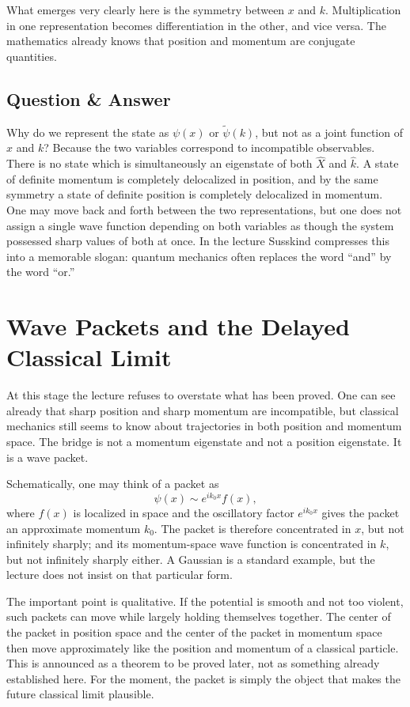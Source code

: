 What emerges very clearly here is the symmetry between \(x\) and \(k\). Multiplication in one representation becomes differentiation in the other, and vice versa. The mathematics already knows that position and momentum are conjugate quantities.

\subsection{Question \& Answer}

Why do we represent the state as \(\psi(x)\) or \(\tilde\psi(k)\), but not as a joint function of \(x\) and \(k\)? Because the two variables correspond to incompatible observables. There is no state which is simultaneously an eigenstate of both \(\hat X\) and \(\hat k\). A state of definite momentum is completely delocalized in position, and by the same symmetry a state of definite position is completely delocalized in momentum. One may move back and forth between the two representations, but one does not assign a single wave function depending on both variables as though the system possessed sharp values of both at once. In the lecture Susskind compresses this into a memorable slogan: quantum mechanics often replaces the word ``and'' by the word ``or.''

\section{Wave Packets and the Delayed Classical Limit}

At this stage the lecture refuses to overstate what has been proved. One can see already that sharp position and sharp momentum are incompatible, but classical mechanics still seems to know about trajectories in both position and momentum space. The bridge is not a momentum eigenstate and not a position eigenstate. It is a wave packet.

Schematically, one may think of a packet as
\begin{equation}
\psi(x)\sim e^{ik_0 x} f(x),
\end{equation}
where \(f(x)\) is localized in space and the oscillatory factor \(e^{ik_0x}\) gives the packet an approximate momentum \(k_0\). The packet is therefore concentrated in \(x\), but not infinitely sharply; and its momentum-space wave function is concentrated in \(k\), but not infinitely sharply either. A Gaussian is a standard example, but the lecture does not insist on that particular form.

The important point is qualitative. If the potential is smooth and not too violent, such packets can move while largely holding themselves together. The center of the packet in position space and the center of the packet in momentum space then move approximately like the position and momentum of a classical particle. This is announced as a theorem to be proved later, not as something already established here. For the moment, the packet is simply the object that makes the future classical limit plausible.

